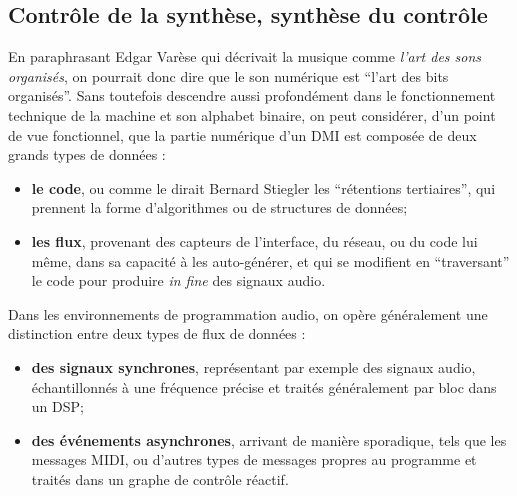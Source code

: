 \subsection{Contrôle de la synthèse, synthèse du contrôle}

\noindent En paraphrasant Edgar Varèse qui décrivait la musique comme \textit{l'art des sons organisés}, on pourrait donc dire que le son numérique est ``l'art des bits organisés''. Sans toutefois descendre aussi profondément dans le fonctionnement technique de la machine et son alphabet binaire, on peut considérer, d'un point de vue fonctionnel, que la partie numérique d'un \gls{DMI} est composée de deux grands types de données :
\vspace{-1em}
\begin{itemize}[noitemsep]
	\item \textbf{le code}, ou comme le dirait Bernard Stiegler les ``rétentions tertiaires'', qui prennent la forme d'algorithmes ou de structures de données;
	\item \textbf{les flux}, provenant des capteurs de l'interface, du réseau, ou du code lui même, dans sa capacité à les auto-générer, et qui se modifient en ``traversant'' le code pour produire \textit{in fine} des signaux audio.
\end{itemize}
\noindent Dans les environnements de programmation audio, on opère généralement une distinction entre deux types de flux de données : 
\vspace{-1em}
\begin{itemize}[noitemsep]
	\item \textbf{des signaux synchrones}, représentant par exemple des signaux audio, échantillonnés à une fréquence précise et traités généralement par bloc dans un \gls{DSP};
	\item \textbf{des événements asynchrones}, arrivant de manière sporadique, tels que les messages \gls{MIDI},  ou d'autres types de messages propres au programme et traités dans un graphe de contrôle réactif.
\end{itemize}

